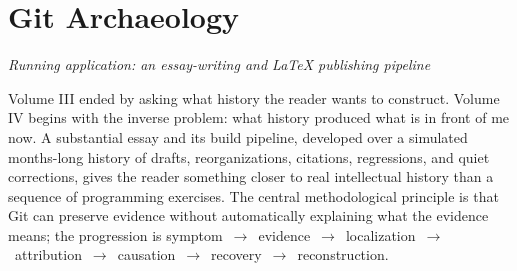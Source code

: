 \documentclass[11pt]{book}
\newcommand{\subheading}[1]{\bigskip\noindent{\bfseries\itshape #1}\smallskip\par}
\begin{document}
\chapter{Git Archaeology}
\textit{Running application: an essay-writing and LaTeX publishing pipeline}

\subheading{Governing Idea}
Volume III ended by asking what history the reader wants to construct. Volume IV begins with the inverse problem: what history produced what is in front of me now. A substantial essay and its build pipeline, developed over a simulated months-long history of drafts, reorganizations, citations, regressions, and quiet corrections, gives the reader something closer to real intellectual history than a sequence of programming exercises. The central methodological principle is that Git can preserve evidence without automatically explaining what the evidence means; the progression is symptom~$\to$~evidence~$\to$~localization~$\to$~attribution~$\to$~causation~$\to$~recovery~$\to$~reconstruction.
\end{document}
